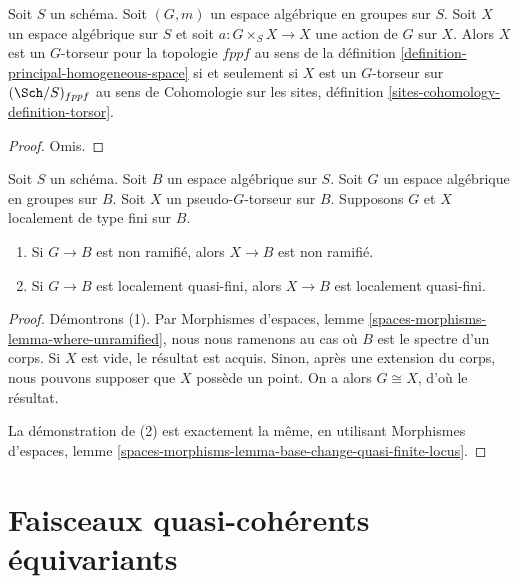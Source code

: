 \begin{lemma}
\label{lemma-torsor}
Soit $S$ un schéma. Soit $(G, m)$ un espace algébrique en groupes sur $S$. Soit $X$ un espace algébrique sur $S$ et soit $a : G \times_S X \to X$ une action de $G$ sur $X$. Alors $X$ est un $G$-torseur pour la topologie $fppf$ au sens de la définition \ref{definition-principal-homogeneous-space} si et seulement si $X$ est un $G$-torseur sur $(\Sch/S)_{fppf}$ au sens de Cohomologie sur les sites, définition \ref{sites-cohomology-definition-torsor}.
\end{lemma}

\begin{proof}
Omis.
\end{proof}

\begin{lemma}
\label{lemma-pseudo-torsor-implications}
Soit $S$ un schéma. Soit $B$ un espace algébrique sur $S$. Soit $G$ un espace algébrique en groupes sur $B$. Soit $X$ un pseudo-$G$-torseur sur $B$. Supposons $G$ et $X$ localement de type fini sur $B$.
\begin{enumerate}
\item Si $G \to B$ est non ramifié, alors $X \to B$ est non ramifié.
\item Si $G \to B$ est localement quasi-fini, alors $X \to B$ est localement quasi-fini.
\end{enumerate}
\end{lemma}

\begin{proof}
Démontrons (1). Par Morphismes d'espaces, lemme \ref{spaces-morphisms-lemma-where-unramified}, nous nous ramenons au cas où $B$ est le spectre d'un corps. Si $X$ est vide, le résultat est acquis. Sinon, après une extension du corps, nous pouvons supposer que $X$ possède un point. On a alors $G \cong X$, d'où le résultat.

\medskip\noindent
La démonstration de (2) est exactement la même, en utilisant Morphismes d'espaces, lemme \ref{spaces-morphisms-lemma-base-change-quasi-finite-locus}.
\end{proof}
















\section{Faisceaux quasi-cohérents équivariants}
\label{section-equivariant}

